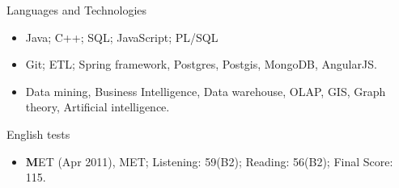 \documentclass[]{mcdowellcv}
\begin{document}
	\begin{cvsection}{Languages and Technologies}
		\begin{cvsubsection}{}{}{}	
			\begin{itemize}
				\item Java; C++; SQL; JavaScript; PL/SQL 
				\item Git; ETL; Spring framework, Postgres, Postgis, MongoDB, AngularJS.
				\item Data mining, Business Intelligence, Data warehouse, OLAP, GIS, Graph theory, Artificial intelligence.				
			\end{itemize}
		\end{cvsubsection}
	\end{cvsection}
	
	\begin{cvsection}{English	tests}
		\begin{cvsubsection}{}{}{}	
			\begin{itemize}
				\item \textbf MET (Apr 2011), MET; Listening: 59(B2); Reading: 56(B2); Final	Score: 115. 
			\end{itemize}
		\end{cvsubsection}
	\end{cvsection}	

	
\end{document}
